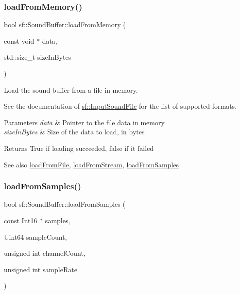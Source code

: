 \subsubsection{\texorpdfstring{load\+From\+Memory()}{loadFromMemory()}}
{\footnotesize\ttfamily bool sf\+::\+Sound\+Buffer\+::load\+From\+Memory (\begin{DoxyParamCaption}\item[{const void $\ast$}]{data,  }\item[{std\+::size\+\_\+t}]{size\+In\+Bytes }\end{DoxyParamCaption})}



Load the sound buffer from a file in memory. 

See the documentation of \hyperlink{classsf_1_1_input_sound_file}{sf\+::\+Input\+Sound\+File} for the list of supported formats.


\begin{DoxyParams}{Parameters}
{\em data} & Pointer to the file data in memory \\
\hline
{\em size\+In\+Bytes} & Size of the data to load, in bytes\\
\hline
\end{DoxyParams}
\begin{DoxyReturn}{Returns}
True if loading succeeded, false if it failed
\end{DoxyReturn}
\begin{DoxySeeAlso}{See also}
\hyperlink{classsf_1_1_sound_buffer_a2be6a8025c97eb622a7dff6cf2594394}{load\+From\+File}, \hyperlink{classsf_1_1_sound_buffer_ad292156b1e01f6dabd4c0c277d5e079e}{load\+From\+Stream}, \hyperlink{classsf_1_1_sound_buffer_a42d51ce4bb3b60c7ea06f63c273fd063}{load\+From\+Samples} 
\end{DoxySeeAlso}
\mbox{\label{classsf_1_1_sound_buffer_a42d51ce4bb3b60c7ea06f63c273fd063}} 
\subsubsection{\texorpdfstring{load\+From\+Samples()}{loadFromSamples()}}
{\footnotesize\ttfamily bool sf\+::\+Sound\+Buffer\+::load\+From\+Samples (\begin{DoxyParamCaption}\item[{const Int16 $\ast$}]{samples,  }\item[{Uint64}]{sample\+Count,  }\item[{unsigned int}]{channel\+Count,  }\item[{unsigned int}]{sample\+Rate }\end{DoxyParamCaption})}




